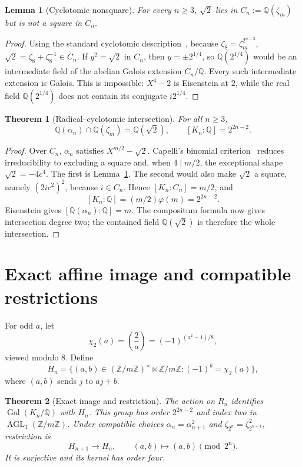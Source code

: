 \documentclass[10pt]{article}
\newtheorem{theorem}{Theorem}
\newtheorem{lemma}{Lemma}
\newcommand{\Q}{\mathbb Q}
\newcommand{\Z}{\mathbb Z}
\newcommand{\Gal}{\operatorname{Gal}}
\newcommand{\AGL}{\operatorname{AGL}}
\begin{document}
\begin{lemma}[Cyclotomic nonsquare]\label{lem:nonsquare}
For every $n\ge3$, $\sqrt2$ lies in $C_n:=\Q(\zeta_m)$ but is not a square
in $C_n$.
\end{lemma}

\begin{proof}
Using the standard cyclotomic description~\cite{Washington}, because
$\zeta_8=\zeta_m^{2^{n-3}}$,
$\sqrt2=\zeta_8+\zeta_8^{-1}\in C_n$.  If $y^2=\sqrt2$ in $C_n$, then
$y=\pm2^{1/4}$, so $\Q(2^{1/4})$ would be an intermediate field of the
abelian Galois extension $C_n/\Q$.  Every such intermediate extension is
Galois.  This is impossible: $X^4-2$ is Eisenstein at $2$, while the real
field $\Q(2^{1/4})$ does not contain its conjugate $i2^{1/4}$.
\end{proof}

\begin{theorem}[Radical--cyclotomic intersection]\label{thm:intersection}
For all $n\ge3$,
\[
 \Q(\alpha_n)\cap\Q(\zeta_m)=\Q(\sqrt2),\qquad
 [K_n:\Q]=2^{2n-2}.
\]
\end{theorem}

\begin{proof}
Over $C_n$, $\alpha_n$ satisfies $X^{m/2}-\sqrt2$.  Capelli's binomial
criterion~\cite{Lang} reduces irreducibility to excluding a square and,
when $4\mid m/2$, the exceptional shape $\sqrt2=-4c^4$.  The first is
Lemma~\ref{lem:nonsquare}.  The second would also make $\sqrt2$ a square,
namely $(2ic^2)^2$, because $i\in C_n$.  Hence
$[K_n:C_n]=m/2$, and
\[
 [K_n:\Q]=(m/2)\varphi(m)=2^{2n-2}.
\]
Eisenstein gives $[\Q(\alpha_n):\Q]=m$.  The compositum formula now gives
intersection degree two; the contained field $\Q(\sqrt2)$ is therefore the
whole intersection.
\end{proof}

\section{Exact affine image and compatible restrictions}
For odd $a$, let
\[
 \chi_2(a)=\left(\frac2a\right)=(-1)^{(a^2-1)/8},
\]
viewed modulo $8$.  Define
\[
 H_n=\{(a,b)\in(\Z/m\Z)^\times\ltimes\Z/m\Z:
              (-1)^b=\chi_2(a)\},
\]
where $(a,b)$ sends $j$ to $aj+b$.

\begin{theorem}[Exact image and restriction]\label{thm:image}
The action on $R_n$ identifies $\Gal(K_n/\Q)$ with $H_n$.  This group has
order $2^{2n-2}$ and index two in $\AGL_1(\Z/m\Z)$.  Under compatible
choices $\alpha_n=\alpha_{n+1}^2$ and
$\zeta_{2^n}=\zeta_{2^{n+1}}^2$, restriction is
\[
 H_{n+1}\longrightarrow H_n,\qquad (a,b)\longmapsto(a,b)\pmod {2^n}.
\]
It is surjective and its kernel has order four.
\end{theorem}
\end{document}
